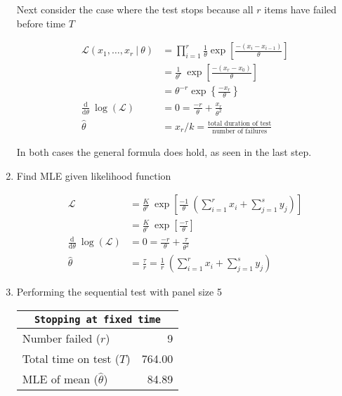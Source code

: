 \begin{enumerate}
	Next consider the case where the test stops because all \(r\) items have failed before time \(T\)

	\begin{align}
		\mathcal{L}(x_1, \dots, x_r\ |\ \theta) &= \prod_{i=1}^{r} \frac{1}{\theta} \exp\left[ \frac{-(x_i - x_{i-1})}{\theta} \right] \\[1ex]
		&= \frac{1}{\theta^r}\ \exp \left[ \frac{- (x_r - x_0)}{\theta} \right] \\[1ex]
		&= \theta^{-r} \exp \left\{ \frac{-x_r}{\theta} \right\} \\[1ex]
		\frac{\mathrm{d}}{\mathrm{d}\theta} \ \log (\mathcal{L}) &= 0 = \frac{-r}{\theta} + \frac{x_r}{\theta^2} \nonumber \\[1ex]
		\widehat{\theta} &= x_r/k = \frac{\text{total duration of test}}{\text{number of failures}}
	\end{align}

	In both cases the general formula does hold, as seen in the last step.
	
	\item Find MLE given likelihood function
	
	\begin{align}
		\mathcal{L} &= \frac{K}{\theta^r}\ \exp \left[ \frac{-1}{\theta}\ \left( \sum\limits_{i=1}^r x_i + \sum\limits_{j = 1}^s y_j  \right) \right] \\[1ex]
		&= \frac{K}{\theta^r}\ \exp \left[ \frac{-\tau}{\theta} \right] \\[1ex]
		\frac{\mathrm{d}}{\mathrm{d}\theta} \ \log (\mathcal{L}) &= 0 = \frac{-r}{\theta} + \frac{\tau}{\theta^2} \nonumber \\[1ex]
		\widehat{\theta} &= \frac{\tau}{r} = \frac{1}{r}\ \left( \sum\limits_{i=1}^r x_i + \sum\limits_{j = 1}^s y_j  \right)
	\end{align}
	
	\item Performing the sequential test with panel size 5
	
	\begin{table}[H]
		\centering
		\begin{tabular}{@{}lr@{}}
		\toprule
		\multicolumn{2}{c}{\texttt{Stopping at fixed time}}
		 \\
		\midrule
		Number failed ($r$)          &       9 \\
		Total time on test ($T$)     &  764.00 \\
		MLE of mean ($\widehat{\theta}$) &   84.89 \\
		\bottomrule
		\end{tabular}
		

\end{table}
\end{enumerate}
